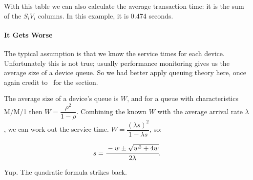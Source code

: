 With this table we can also calculate the average transaction time: it is the sum of the $S_{i}V_{i}$ columns. In this example, it is 0.474 seconds. 

\paragraph*{It Gets Worse}

The typical assumption is that we know the service times for each device. Unfortunately this is not true; usually performance monitoring gives us the average size of a device queue. So we had better apply queuing theory here, once again credit to~\cite{williams-calc} for the section. 

The average size of a device's queue is $W$, and for a queue with characteristics M/M/1 then $W = \dfrac{\rho^{2}}{1-\rho}$. Combining the known $W$ with the average arrival rate $\lambda$, we can work out the service time. $W = \dfrac{(\lambda s)^{2}}{1 - \lambda s}$, so:

\[ s = \cfrac{-w \pm \sqrt{w^{2}+4w}}{2\lambda}.\]

Yup. The quadratic formula strikes back. 




